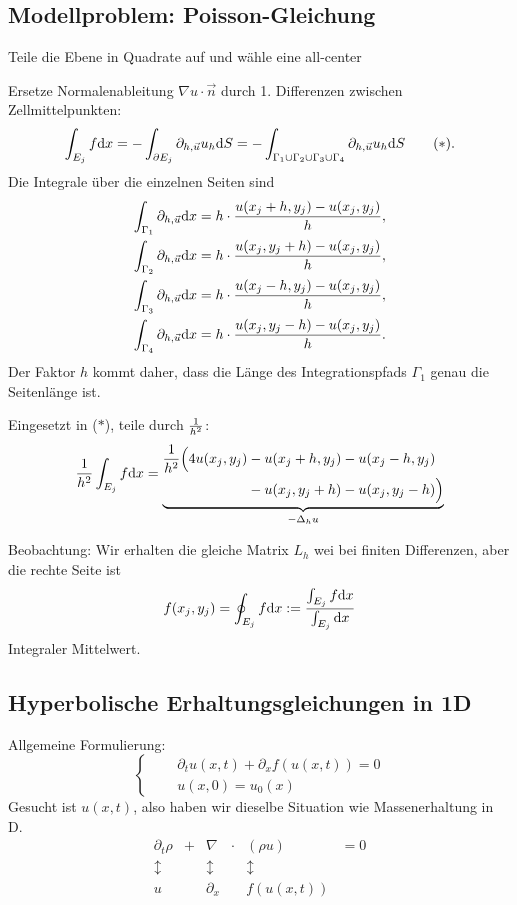 \subsection{Modellproblem: Poisson-Gleichung} %
Teile die Ebene in Quadrate auf und wähle eine all-center

Ersetze Normalenableitung  $\nabla u \cdot \vec{n}$ durch 1. Differenzen
zwischen Zellmittelpunkten:
\[ \int_{E_j} f \mathrm{d} x = - \int_{\partial E_j} \partial_{h,\vec{u}} u_h
  \mathrm{d} S = - \int_{\Gamma_1 \cup \Gamma_2 \cup \Gamma_3 \cup \Gamma_4}
  \partial_{h,\vec{u}} u_h \mathrm{d} S \tag{$*$}. \]
Die Integrale über die einzelnen Seiten sind
\begin{align*}
  \int_{\Gamma_1} \partial_{h,\vec{u}} \mathrm{d} x
  &= h \cdot \frac{u(x_j + h, y_j) - u(x_j, y_j)}{h}, \\
  \int_{\Gamma_2} \partial_{h,\vec{u}} \mathrm{d} x
  &= h \cdot \frac{u(x_j, y_j + h) - u(x_j, y_j)}{h}, \\
  \int_{\Gamma_3} \partial_{h,\vec{u}} \mathrm{d} x
  &= h \cdot \frac{u(x_j - h, y_j) - u(x_j, y_j)}{h}, \\
  \int_{\Gamma_4} \partial_{h,\vec{u}} \mathrm{d} x
  &= h \cdot \frac{u(x_j, y_j - h) - u(x_j, y_j)}{h}.
\end{align*}
Der Faktor $h$ kommt daher, dass die Länge des Integrationspfads $\Gamma_1$
genau die Seitenlänge ist.

Eingesetzt in ($*$), teile durch $\frac{1}{h^2}$:
\[ \frac{1}{h^2} \int_{E_j} f \mathrm{d} x =
  \underbrace{
    \begin{aligned}
      \frac{1}{h^2} \Big( 4 u(x_j,y_j)
      &- u(x_j+h,y_j) - u(x_j-h,y_j) \\
      &- u(x_j,y_j+h) - u(x_j,y_j-h) \Big) 
    \end{aligned}
  }_{
    -\Delta_h u } \]

Beobachtung: Wir erhalten die gleiche Matrix $L_h$ wei bei finiten Differenzen,
aber die rechte Seite ist
\[ f(x_j,y_j) = \oint_{E_j} f \mathrm{d} x := \frac{\int_{E_j} f \mathrm{d}
    x}{\int_{E_j} \mathrm{d} x} \]
Integraler Mittelwert.

\subsection{Hyperbolische Erhaltungsgleichungen in 1D} %
Allgemeine Formulierung:
\[ \left\{ \quad \begin{aligned}
      &\partial_t u (x,t) + \partial_x f(u(x,t)) = 0 \\
      &u(x,0) = u_0(x)
    \end{aligned} \right. \tag{$\circ$} \]
Gesucht ist $u(x,t)$, also haben wir dieselbe Situation wie Massenerhaltung in
D.
\[
  \begin{array}{cccccc}
    \partial_t \rho & + & \nabla & \cdot & (\rho u) & = 0 \\
    \updownarrow & & \updownarrow & & \updownarrow \\
    u & & \partial_x & & f(u(x,t))
  \end{array} \]

